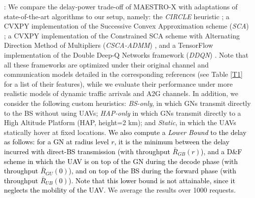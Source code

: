\documentclass[12pt, draftcls, onecolumn]{IEEEtran}
\theoremstyle{plain}
\theoremstyle{definition}
\theoremstyle{remark}
\newcommand\hlt[1]{\textcolor{black}{#1}}
\begin{document}
: We compare the delay-power trade-off of MAESTRO-X with adaptations of state-of-the-art algorithms to our setup, namely: the \emph{CIRCLE} heuristic \cite{MEC-DDPG}; a CVXPY implementation of the Successive Convex Approximation scheme (\emph{SCA}) \cite{SCA}; a CVXPY implementation of the Constrained SCA scheme with Alternating Direction Method of Multipliers (\emph{CSCA-ADMM}) \cite{CSCA-ADMM}, and a TensorFlow implementation of the Double Deep-Q Networks framework (\emph{DDQN}) \cite{DDQN}. Note that all these frameworks are optimized under their original channel and communication models detailed in the corresponding references (see Table \ref{T1} for a list of their features), while we evaluate their performance under more realistic models of dynamic traffic arrivals and A2G channels. In addition, we consider the following custom heuristics: \emph{BS-only}, in which GNs transmit directly to the BS without using UAVs; \emph{HAP-only} in which GNs transmit directly to a High Altitude Platform (HAP, height=2 km); and \emph{Static}, in which the UAVs statically hover at fixed locations.
\label{LB}
\hlt{We also compute a \emph{Lower Bound} to the delay as follows:
for a GN at radius level $r$,
it is the minimum between the delay incurred with direct-BS transmission (with throughput $\bar{R}_{GB}(r)$), and a D\&F scheme in which the UAV is on top of the GN during the decode phase (with throughput $\bar{R}_{GU}(0)$), and
on top of the BS during the forward phase (with throughput $\bar{R}_{UB}(0)$). Note that this lower bound is not attainable, since it neglects the mobility of the UAV.}
We average the results over 1000 requests.
\end{document}
